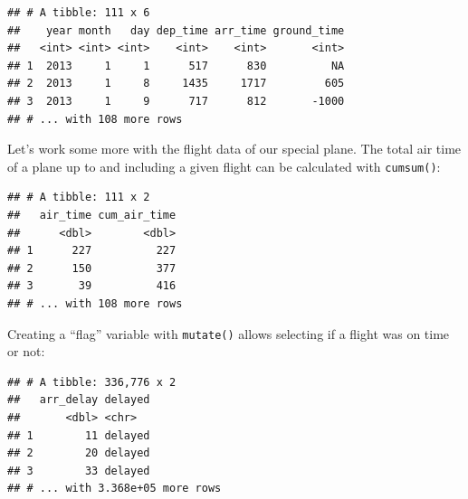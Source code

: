 \documentclass[]{book}
\newenvironment{Shaded}{}{}
\newcommand{\DataTypeTok}[1]{#1}
\newcommand{\DecValTok}[1]{#1}
\newcommand{\KeywordTok}[1]{\textcolor[rgb]{0.00,0.00,1.00}{#1}}
\newcommand{\NormalTok}[1]{#1}
\newcommand{\OperatorTok}[1]{#1}
\newcommand{\StringTok}[1]{\textcolor[rgb]{0.00,0.50,0.50}{#1}}
\begin{document}
\begin{verbatim}
## # A tibble: 111 x 6
##    year month   day dep_time arr_time ground_time
##   <int> <int> <int>    <int>    <int>       <int>
## 1  2013     1     1      517      830          NA
## 2  2013     1     8     1435     1717         605
## 3  2013     1     9      717      812       -1000
## # ... with 108 more rows
\end{verbatim}

Let's work some more with the flight data of our special plane.
The total air time of a plane up to and including a given flight can be calculated with \texttt{cumsum()}:

\begin{Shaded}
\end{Shaded}

\begin{verbatim}
## # A tibble: 111 x 2
##   air_time cum_air_time
##      <dbl>        <dbl>
## 1      227          227
## 2      150          377
## 3       39          416
## # ... with 108 more rows
\end{verbatim}

Creating a ``flag'' variable with \texttt{mutate()} allows selecting if a flight was on time or not:

\begin{Shaded}
\end{Shaded}

\begin{verbatim}
## # A tibble: 336,776 x 2
##   arr_delay delayed
##       <dbl> <chr>  
## 1        11 delayed
## 2        20 delayed
## 3        33 delayed
## # ... with 3.368e+05 more rows
\end{verbatim}
\end{document}

